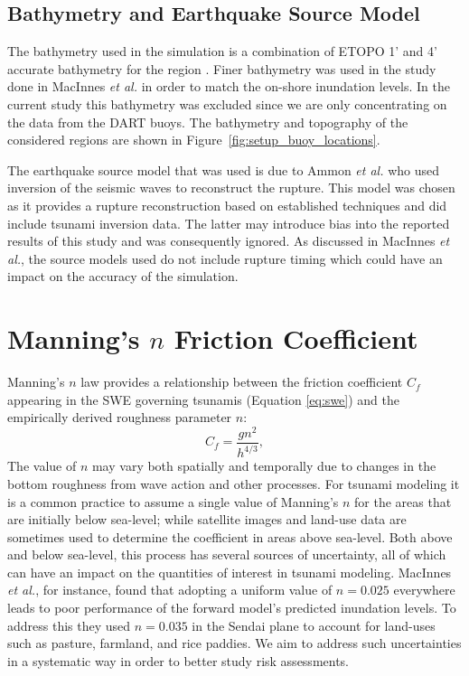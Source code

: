 \subsection{Bathymetry and Earthquake Source Model}

The bathymetry used in the simulation is a combination of ETOPO 1' and 4'
accurate bathymetry for the region \cite{Amante:2009ud}.  Finer bathymetry was
used in the study done in MacInnes \emph{et al.} in order to match the on-shore
inundation levels.  In the current study this bathymetry was excluded since we
are only concentrating on the data from the DART buoys. The bathymetry and 
topography of the considered regions are shown in Figure~\ref{fig:setup_buoy_locations}.

The earthquake source model that was used is due to Ammon \emph{et al.}
\cite{Ammon:2011dm} who used inversion of the seismic waves to reconstruct the
rupture.  This model was chosen as it provides a rupture reconstruction based on
established techniques and did include tsunami inversion data.  The
latter may introduce bias into the reported results of this study and was consequently ignored.
As discussed in MacInnes \emph{et al.}, the source models used do not include
rupture timing which could have an impact on the accuracy of the simulation.


\section{Manning's $n$ Friction Coefficient} \label{sec:manning}

Manning's $n$ law provides a relationship between the friction coefficient
$C_f$ appearing in the SWE governing tsunamis (Equation \ref{eq:swe}) and 
the empirically derived roughness parameter $n$:
\begin{equation}
    C_f = \frac{g n^2}{h^{4/3}},
\label{eq:coef}
\end{equation}
The value of $n$ may vary both spatially and temporally due to changes in the
bottom roughness from wave action and other processes.  For tsunami modeling it
is a common practice to assume a single value of Manning's $n$ for the areas
that are initially below sea-level; while satellite images and 
land-use data are sometimes used to determine the coefficient in areas above sea-level.  
Both above and below sea-level, this process has several sources of uncertainty, all
of which can have an impact on the quantities of interest in tsunami modeling.   
MacInnes \emph{et al.}, for instance, found that adopting a uniform value 
of $n = 0.025$ everywhere leads to poor performance of the forward model's predicted 
inundation levels.  To address this they used $n = 0.035$ in the Sendai plane to 
account for land-uses such as pasture, farmland, and rice paddies.  We aim to address such
uncertainties in a systematic way in order to better study risk assessments.


